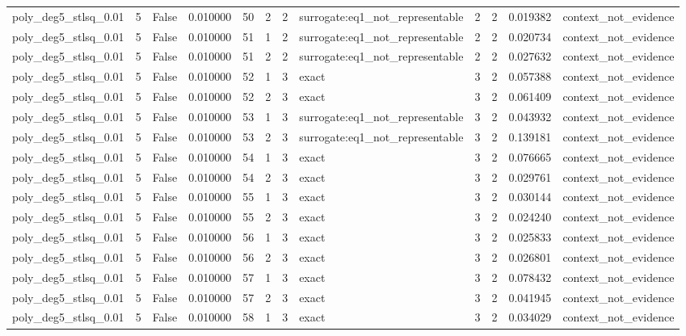 \begin{tabular}{lrrrrrrlrrrl}
poly\_deg5\_stlsq\_0.01 & 5 & False & 0.010000 & 50 & 2 & 2 & surrogate:eq1\_not\_representable & 2 & 2 & 0.019382 & context\_not\_evidence \\
poly\_deg5\_stlsq\_0.01 & 5 & False & 0.010000 & 51 & 1 & 2 & surrogate:eq1\_not\_representable & 2 & 2 & 0.020734 & context\_not\_evidence \\
poly\_deg5\_stlsq\_0.01 & 5 & False & 0.010000 & 51 & 2 & 2 & surrogate:eq1\_not\_representable & 2 & 2 & 0.027632 & context\_not\_evidence \\
poly\_deg5\_stlsq\_0.01 & 5 & False & 0.010000 & 52 & 1 & 3 & exact & 3 & 2 & 0.057388 & context\_not\_evidence \\
poly\_deg5\_stlsq\_0.01 & 5 & False & 0.010000 & 52 & 2 & 3 & exact & 3 & 2 & 0.061409 & context\_not\_evidence \\
poly\_deg5\_stlsq\_0.01 & 5 & False & 0.010000 & 53 & 1 & 3 & surrogate:eq1\_not\_representable & 3 & 2 & 0.043932 & context\_not\_evidence \\
poly\_deg5\_stlsq\_0.01 & 5 & False & 0.010000 & 53 & 2 & 3 & surrogate:eq1\_not\_representable & 3 & 2 & 0.139181 & context\_not\_evidence \\
poly\_deg5\_stlsq\_0.01 & 5 & False & 0.010000 & 54 & 1 & 3 & exact & 3 & 2 & 0.076665 & context\_not\_evidence \\
poly\_deg5\_stlsq\_0.01 & 5 & False & 0.010000 & 54 & 2 & 3 & exact & 3 & 2 & 0.029761 & context\_not\_evidence \\
poly\_deg5\_stlsq\_0.01 & 5 & False & 0.010000 & 55 & 1 & 3 & exact & 3 & 2 & 0.030144 & context\_not\_evidence \\
poly\_deg5\_stlsq\_0.01 & 5 & False & 0.010000 & 55 & 2 & 3 & exact & 3 & 2 & 0.024240 & context\_not\_evidence \\
poly\_deg5\_stlsq\_0.01 & 5 & False & 0.010000 & 56 & 1 & 3 & exact & 3 & 2 & 0.025833 & context\_not\_evidence \\
poly\_deg5\_stlsq\_0.01 & 5 & False & 0.010000 & 56 & 2 & 3 & exact & 3 & 2 & 0.026801 & context\_not\_evidence \\
poly\_deg5\_stlsq\_0.01 & 5 & False & 0.010000 & 57 & 1 & 3 & exact & 3 & 2 & 0.078432 & context\_not\_evidence \\
poly\_deg5\_stlsq\_0.01 & 5 & False & 0.010000 & 57 & 2 & 3 & exact & 3 & 2 & 0.041945 & context\_not\_evidence \\
poly\_deg5\_stlsq\_0.01 & 5 & False & 0.010000 & 58 & 1 & 3 & exact & 3 & 2 & 0.034029 & context\_not\_evidence \\

\end{tabular}
